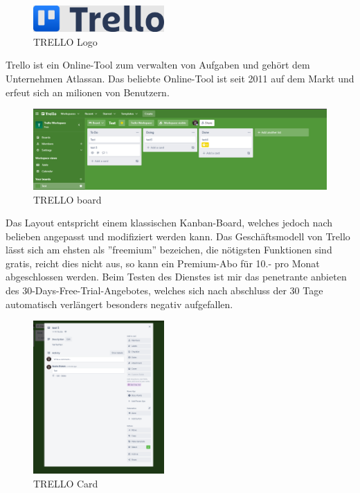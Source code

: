 
\begin{figure}[H]
    \begin{center}
        \includegraphics[width=5cm]{../content/images/Trello/TrelloLogo.png}
        \caption{TRELLO Logo}
    \end{center}
\end{figure}

Trello ist ein Online-Tool zum verwalten von Aufgaben und gehört dem Unternehmen Atlassan. 
Das beliebte Online-Tool ist seit 2011 auf dem Markt und erfeut sich an milionen von Benutzern.


\begin{figure}[H]
    \begin{center}
        \includegraphics[width=16cm]{../content/images/Trello/TrelloBoard.png}
        \caption{TRELLO board}
    \end{center}
\end{figure}

Das Layout entspricht einem klassischen Kanban-Board, welches jedoch nach belieben angepasst und
modifiziert werden kann. Das Geschäftsmodell von Trello lässt sich am ehsten als ''freemium'' bezeichen, die nötigsten Funktionen
sind gratis, reicht dies nicht aus, so kann ein Premium-Abo für 10.- pro Monat abgeschlossen werden.
Beim Testen des Dienstes ist mir das penetrante anbieten des 30-Days-Free-Trial-Angebotes, welches sich nach abschluss der 30 Tage automatisch verlängert
besonders negativ aufgefallen.\\
\space
\begin{figure}[H]
    \begin{center}
        \includegraphics[width=5cm]{../content/images/Trello/TrelloCard.png}
        \caption{TRELLO Card}
    \end{center}
\end{figure}

